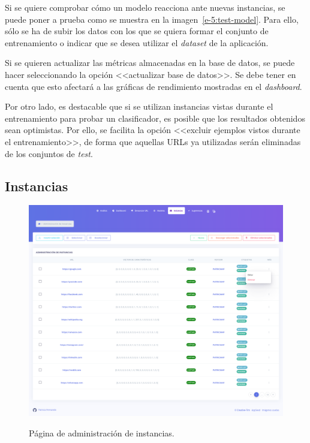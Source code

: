 Si se quiere comprobar cómo un modelo reacciona ante nuevas instancias, se puede poner a prueba como se muestra en la imagen~\ref{e-5:test-model}. Para ello, sólo se ha de subir los datos con los que se quiera formar el conjunto de entrenamiento o indicar que se desea utilizar el \textit{dataset} de la aplicación.

Si se quieren actualizar las métricas almacenadas en la base de datos, se puede hacer seleccionando la opción <<actualizar base de datos>>. Se debe tener en cuenta que esto afectará a las gráficas de rendimiento mostradas en el \textit{dashboard}.

Por otro lado, es destacable que si se utilizan instancias vistas durante el entrenamiento para probar un clasificador, es posible que los resultados obtenidos sean optimistas. Por ello, se facilita la opción <<excluir ejemplos vistos durante el entrenamiento>>, de forma que aquellas URLs ya utilizadas serán eliminadas de los conjuntos de \textit{test}.

\subsection{Instancias}
\label{s-e:instances}

\begin{figure}[h]
	\caption[Manual de usuario: página de instancias]{Página de administración de instancias.}
	\centering
	\includegraphics[width=\textwidth]{../img/anexos/user_guide/6_instances}
	\label{e-5:instances}
\end{figure}

